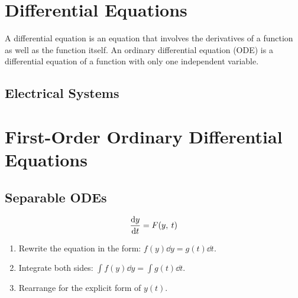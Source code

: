 \documentclass{article}
\begin{document}
\section{Differential Equations}
\begin{definition}
    A differential equation is an equation that involves the derivatives of a function as well as the function itself.
    An ordinary differential equation (ODE) is a differential equation of a function with only one independent variable.
\end{definition}
\subsection{Electrical Systems}

\section{First-Order Ordinary Differential Equations}
\subsection{Separable ODEs}
\begin{equation*}
    \dv{y}{t} = F(y,\: t) 
\end{equation*}
\begin{enumerate}
    \item Rewrite the equation in the form: $f(y)\dd{y} = g(t)\dd{t}$.
    \item Integrate both sides: $\int f(y)\dd{y} = \int g(t)\dd{t}$.
    \item Rearrange for the explicit form of $y(t)$.
\end{enumerate}
\end{document}
